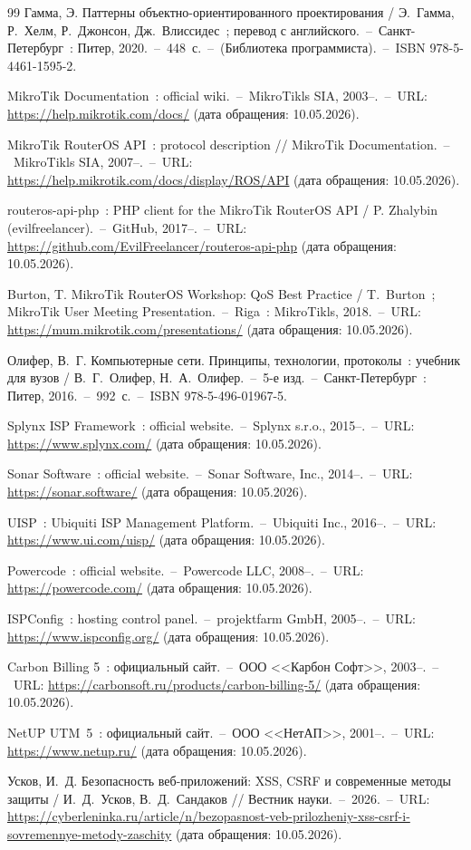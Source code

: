 \begin{thebibliography}{99}
 Гамма, Э. Паттерны объектно-ориентированного проектирования / Э.~Гамма, Р.~Хелм, Р.~Джонсон, Дж.~Влиссидес~; перевод с английского.~--~Санкт-Петербург~: Питер, 2020.~--~448~с.~--~(Библиотека программиста).~--~ISBN 978-5-4461-1595-2.

 MikroTik Documentation~: official wiki.~--~MikroTikls SIA, 2003--.~--~URL: \url{https://help.mikrotik.com/docs/} (дата обращения: 10.05.2026).

 MikroTik RouterOS API~: protocol description // MikroTik Documentation.~--~MikroTikls SIA, 2007--.~--~URL: \url{https://help.mikrotik.com/docs/display/ROS/API} (дата обращения: 10.05.2026).

 routeros-api-php~: PHP client for the MikroTik RouterOS API / P. Zhalybin (evilfreelancer).~--~GitHub, 2017--.~--~URL: \url{https://github.com/EvilFreelancer/routeros-api-php} (дата обращения: 10.05.2026).

 Burton, T. MikroTik RouterOS Workshop: QoS Best Practice / T.~Burton~; MikroTik User Meeting Presentation.~--~Riga~: MikroTikls, 2018.~--~URL: \url{https://mum.mikrotik.com/presentations/} (дата обращения: 10.05.2026).

 Олифер, В.~Г. Компьютерные сети. Принципы, технологии, протоколы~: учебник для вузов / В.~Г.~Олифер, Н.~А.~Олифер.~--~5-е изд.~--~Санкт-Петербург~: Питер, 2016.~--~992~с.~--~ISBN 978-5-496-01967-5.

 Splynx ISP Framework~: official website.~--~Splynx s.r.o., 2015--.~--~URL: \url{https://www.splynx.com/} (дата обращения: 10.05.2026).

 Sonar Software~: official website.~--~Sonar Software, Inc., 2014--.~--~URL: \url{https://sonar.software/} (дата обращения: 10.05.2026).

 UISP~: Ubiquiti ISP Management Platform.~--~Ubiquiti Inc., 2016--.~--~URL: \url{https://www.ui.com/uisp/} (дата обращения: 10.05.2026).

 Powercode~: official website.~--~Powercode LLC, 2008--.~--~URL: \url{https://powercode.com/} (дата обращения: 10.05.2026).

 ISPConfig~: hosting control panel.~--~projektfarm GmbH, 2005--.~--~URL: \url{https://www.ispconfig.org/} (дата обращения: 10.05.2026).

 Carbon Billing 5~: официальный сайт.~--~ООО <<Карбон Софт>>, 2003--.~--~URL: \url{https://carbonsoft.ru/products/carbon-billing-5/} (дата обращения: 10.05.2026).

 NetUP UTM~5~: официальный сайт.~--~ООО <<НетАП>>, 2001--.~--~URL: \url{https://www.netup.ru/} (дата обращения: 10.05.2026).

 Усков, И.~Д. Безопасность веб-приложений: XSS, CSRF и современные методы защиты / И.~Д.~Усков, В.~Д.~Сандаков // Вестник науки.~--~2026.~--~URL: \url{https://cyberleninka.ru/article/n/bezopasnost-veb-prilozheniy-xss-csrf-i-sovremennye-metody-zaschity} (дата обращения: 10.05.2026).

\end{thebibliography}
